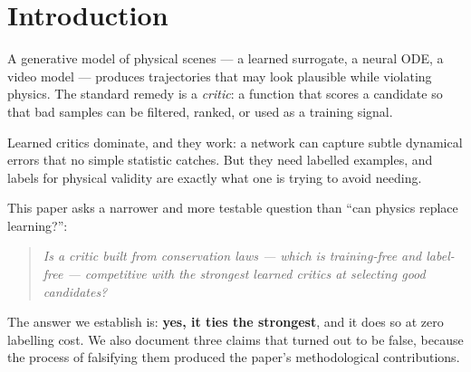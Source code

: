 \documentclass[11pt]{article}
\begin{document}
\begin{abstract}
Three methodological findings, each independently useful. (i) \textbf{Pooled rank
correlation is misleading for critics}: a supervised regressor scored pooled Spearman
$\rho=-0.67$, comparable to the best critic, while achieving a within-group win rate of
$53\%$, i.e.\ chance. (ii) \textbf{A conservation channel's discriminative power is set
by its noise floor}, determined by the integrator and force structure rather than by the
physical importance of the quantity: momentum and angular momentum are conserved
\emph{exactly} by any pairwise central-force integrator (floor $\sim10^{-16}$) and
separate true from generated trajectories by $\sim10^{12}$, whereas energy is conserved
only to the integrator's truncation error ($O(\Delta t)$, floor $0.60$ at
$\Delta t=0.01$) and separates by only $1.13\times$. (iii) \textbf{Synthetic failure
modes must be validated before use}: a taxonomy of hand-built corruptions is not
structurally comparable to a real generator's failures --- two of five cannot be tuned
to the generator's error magnitude at all, and conservation fingerprints differ by up
to $238$ normalized units.
\end{abstract}

\section{Introduction}

A generative model of physical scenes --- a learned surrogate, a neural ODE, a video
model --- produces trajectories that may look plausible while violating physics. The
standard remedy is a \emph{critic}: a function that scores a candidate so that bad
samples can be filtered, ranked, or used as a training signal.

Learned critics dominate, and they work: a network can capture subtle dynamical errors
that no simple statistic catches. But they need labelled examples, and labels for
physical validity are exactly what one is trying to avoid needing.

This paper asks a narrower and more testable question than ``can physics replace
learning?'':

\begin{quote}
\emph{Is a critic built from conservation laws --- which is training-free and
label-free --- competitive with the strongest learned critics at selecting good
candidates?}
\end{quote}

The answer we establish is: \textbf{yes, it ties the strongest}, and it does so at zero
labelling cost. We also document three claims that turned out to be false, because the
process of falsifying them produced the paper's methodological contributions.
\end{document}
